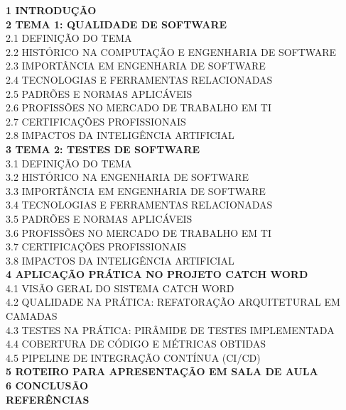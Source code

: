 \documentclass[12pt,a4paper]{article}
\begin{document}
\noindent\footnotesize \textbf{1 INTRODUÇÃO} \\
\noindent\footnotesize \textbf{2 TEMA 1: QUALIDADE DE SOFTWARE} \\
\noindent\footnotesize 2.1 DEFINIÇÃO DO TEMA \\
\noindent\footnotesize 2.2 HISTÓRICO NA COMPUTAÇÃO E ENGENHARIA DE SOFTWARE \\
\noindent\footnotesize 2.3 IMPORTÂNCIA EM ENGENHARIA DE SOFTWARE \\
\noindent\footnotesize 2.4 TECNOLOGIAS E FERRAMENTAS RELACIONADAS \\
\noindent\footnotesize 2.5 PADRÕES E NORMAS APLICÁVEIS \\
\noindent\footnotesize 2.6 PROFISSÕES NO MERCADO DE TRABALHO EM TI \\
\noindent\footnotesize 2.7 CERTIFICAÇÕES PROFISSIONAIS \\
\noindent\footnotesize 2.8 IMPACTOS DA INTELIGÊNCIA ARTIFICIAL \\
\noindent\footnotesize \textbf{3 TEMA 2: TESTES DE SOFTWARE} \\
\noindent\footnotesize 3.1 DEFINIÇÃO DO TEMA \\
\noindent\footnotesize 3.2 HISTÓRICO NA ENGENHARIA DE SOFTWARE \\
\noindent\footnotesize 3.3 IMPORTÂNCIA EM ENGENHARIA DE SOFTWARE \\
\noindent\footnotesize 3.4 TECNOLOGIAS E FERRAMENTAS RELACIONADAS \\
\noindent\footnotesize 3.5 PADRÕES E NORMAS APLICÁVEIS \\
\noindent\footnotesize 3.6 PROFISSÕES NO MERCADO DE TRABALHO EM TI \\
\noindent\footnotesize 3.7 CERTIFICAÇÕES PROFISSIONAIS \\
\noindent\footnotesize 3.8 IMPACTOS DA INTELIGÊNCIA ARTIFICIAL \\
\noindent\footnotesize \textbf{4 APLICAÇÃO PRÁTICA NO PROJETO CATCH WORD} \\
\noindent\footnotesize 4.1 VISÃO GERAL DO SISTEMA CATCH WORD \\
\noindent\footnotesize 4.2 QUALIDADE NA PRÁTICA: REFATORAÇÃO ARQUITETURAL EM CAMADAS \\
\noindent\footnotesize 4.3 TESTES NA PRÁTICA: PIRÂMIDE DE TESTES IMPLEMENTADA \\
\noindent\footnotesize 4.4 COBERTURA DE CÓDIGO E MÉTRICAS OBTIDAS \\
\noindent\footnotesize 4.5 PIPELINE DE INTEGRAÇÃO CONTÍNUA (CI/CD) \\
\noindent\footnotesize \textbf{5 ROTEIRO PARA APRESENTAÇÃO EM SALA DE AULA} \\
\noindent\footnotesize \textbf{6 CONCLUSÃO} \\
\noindent\footnotesize \textbf{REFERÊNCIAS} 
\end{document}
